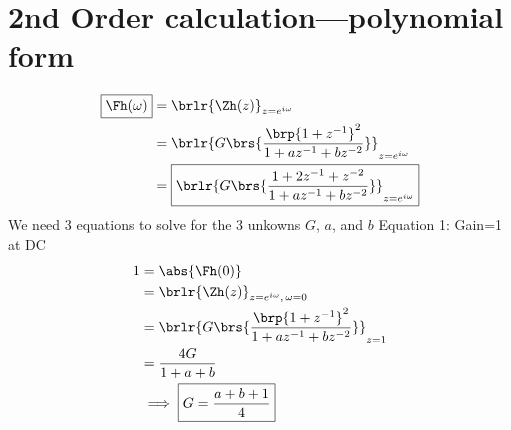 \section{2nd Order  calculation---polynomial form}
 \vfill
\begin{align*}
  \boxed{\Fh(\omega)}
    &= \brlr{\Zh(z)}_{z=e^{i\omega}}
  \\&= \brlr{G\brs{\frac{\brp{1+z^{-1}}^2}
                        {1 + az^{-1} + bz^{-2}}}}_{z=e^{i\omega}}
  \\&= \boxed{\brlr{
         G\brs{\frac{1 + 2z^{-1} +  z^{-2}}
                    {1 + az^{-1} + bz^{-2}}
              }
                   }_{z=e^{i\omega}}
             }
\end{align*}
\vfill
We need 3 equations to solve for the 3 unkowns $G$, $a$, and $b$
\vfill 
Equation 1: Gain=1 at DC
\vfill
\begin{align*}
  1 &= \abs{\Fh(0)}
  \\&= \brlr{\Zh(z)}_{z=e^{i\omega},\,\omega=0}
  \\&= \brlr{G\brs{\frac{\brp{1+z^{-1}}^2}
                      {1 + az^{-1} + bz^{-2}}}}_{z=1}
  \\&= \frac{4G}{1 + a + b}
  \\&\implies \boxed{G = \frac{a + b + 1}{4}}
\end{align*}
\vfill 

